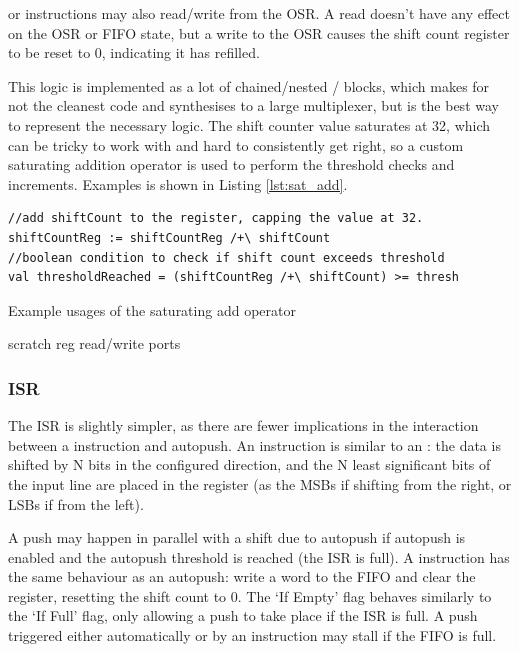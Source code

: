  or  instructions may also read/write from the OSR. A read doesn't have any effect on the OSR or FIFO state, but a write to the OSR causes the shift count register to be reset to 0, indicating it has refilled.

This logic is implemented as a lot of chained/nested / blocks, which makes for not the cleanest code and synthesises to a large multiplexer, but is the best way to represent the necessary logic. The shift counter value saturates at 32, which can be tricky to work with and hard to consistently get right, so a custom saturating addition operator \txt{+!} is used to perform the threshold checks and increments. Examples is shown in Listing \ref{lst:sat_add}.


\begin{listing}[h!]
    \vspace{0.5cm}
    \begin{verbatim}
//add shiftCount to the register, capping the value at 32.
shiftCountReg := shiftCountReg /+\ shiftCount
//boolean condition to check if shift count exceeds threshold
val thresholdReached = (shiftCountReg /+\ shiftCount) >= thresh
    \end{verbatim}
    \caption{Example usages of the saturating add operator}
    \label{lst:sat_add}
\end{listing}


scratch reg
read/write ports

\subsubsection{ISR}

The ISR is slightly simpler, as there are fewer implications in the interaction between a  instruction and autopush. An  instruction is similar to an : the data is shifted by N bits in the configured direction, and the N least significant bits of the input line are placed in the register (as the MSBs if shifting from the right, or LSBs if from the left).

A push may happen in parallel with a shift due to autopush if autopush is enabled and the autopush threshold is reached (the ISR is full). A  instruction has the same behaviour as an autopush: write a word to the FIFO and clear the register, resetting the shift count to 0. The `If Empty' flag behaves similarly to the `If Full' flag, only allowing a push to take place if the ISR is full. A push triggered either automatically or by an instruction may stall if the FIFO is full.

